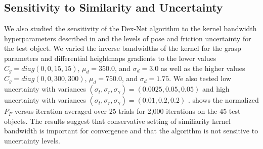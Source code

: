 \subsection{Sensitivity to Similarity and Uncertainty}
We also studied the sensitivity of the Dex-Net algorithm to the kernel bandwidth hyperparameters described in  and the levels of pose and friction uncertainty for the test object.
We varied the inverse bandwidths of the kernel for the grasp parameters and differential heightmaps gradients to the lower values $C_g = diag(0,0,15, 15)$, $\mu_d = 350.0$,  and $\sigma_d = 3.0$ as well as the higher values $C_g = diag(0,0,300, 300)$, $\mu_d = 750.0$,  and $\sigma_d = 1.75$.
We also tested low uncertainty with variances $(\sigma_{t}, \sigma_{r}, \sigma_{\gamma}) = (0.0025, 0.05, 0.05)$ and high uncertainty with variances $(\sigma_{t}, \sigma_{r}, \sigma_{\gamma}) = (0.01, 0.2, 0.2)$ .
 shows the normalized $P_F$ versus iteration averaged over 25 trials for 2,000 iterations on the 45 test objects.
The results suggest that conservative setting of similiarity kernel bandwidth is important for convergence and that the algorithm is not sensitive to uncertainty levels.

